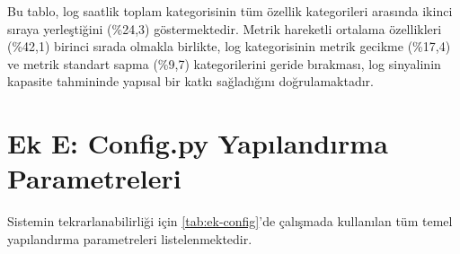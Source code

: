 \begin{ekler}
Bu tablo, log saatlik toplam kategorisinin tüm özellik kategorileri arasında ikinci sıraya yerleştiğini (\%24{,}3) göstermektedir.
Metrik hareketli ortalama özellikleri (\%42{,}1) birinci sırada olmakla birlikte, log kategorisinin metrik gecikme (\%17{,}4) ve metrik standart sapma (\%9{,}7) kategorilerini geride bırakması, log sinyalinin kapasite tahmininde yapısal bir katkı sağladığını doğrulamaktadır.

\section*{Ek E: Config.py Yapılandırma Parametreleri}

Sistemin tekrarlanabilirliği için \autoref{tab:ek-config}'de çalışmada kullanılan tüm temel yapılandırma parametreleri listelenmektedir.


\end{ekler}

